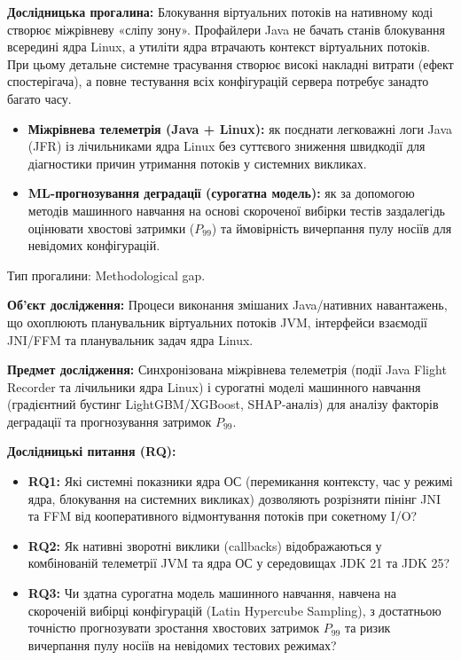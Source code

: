 \textbf{Дослідницька прогалина:} Блокування віртуальних потоків на нативному коді створює міжрівневу «сліпу зону». Профайлери Java не бачать станів блокування всередині ядра Linux, а утиліти ядра втрачають контекст віртуальних потоків. При цьому детальне системне трасування створює високі накладні витрати (ефект спостерігача), а повне тестування всіх конфігурацій сервера потребує занадто багато часу.
\begin{itemize}[wide]
    \item \textbf{Міжрівнева телеметрія (Java + Linux):} як поєднати легковажні логи Java (JFR) із лічильниками ядра Linux без суттєвого зниження швидкодії для діагностики причин утримання потоків у системних викликах.
    \item \textbf{ML-прогнозування деградації (сурогатна модель):} як за допомогою методів машинного навчання на основі скороченої вибірки тестів заздалегідь оцінювати хвостові затримки ($P_{99}$) та ймовірність вичерпання пулу носіїв для невідомих конфігурацій.
\end{itemize}
Тип прогалини: Methodological gap.

\textbf{Об'єкт дослідження:} Процеси виконання змішаних Java/нативних навантажень, що охоплюють планувальник віртуальних потоків JVM, інтерфейси взаємодії JNI/FFM та планувальник задач ядра Linux.

\textbf{Предмет дослідження:} Синхронізована міжрівнева телеметрія (події Java Flight Recorder та лічильники ядра Linux) і сурогатні моделі машинного навчання (градієнтний бустинг LightGBM/XGBoost, SHAP-аналіз) для аналізу факторів деградації та прогнозування затримок $P_{99}$.

\textbf{Дослідницькі питання (RQ):}
\begin{itemize}[wide]
    \item \textbf{RQ1:} Які системні показники ядра ОС (перемикання контексту, час у режимі ядра, блокування на системних викликах) дозволяють розрізняти пінінг JNI та FFM від кооперативного відмонтування потоків при сокетному I/O?
    \item \textbf{RQ2:} Як нативні зворотні виклики (callbacks) відображаються у комбінованій телеметрії JVM та ядра ОС у середовищах JDK 21 та JDK 25?
    \item \textbf{RQ3:} Чи здатна сурогатна модель машинного навчання, навчена на скороченій вибірці конфігурацій (Latin Hypercube Sampling), з достатньою точністю прогнозувати зростання хвостових затримок $P_{99}$ та ризик вичерпання пулу носіїв на невідомих тестових режимах?
\end{itemize}

